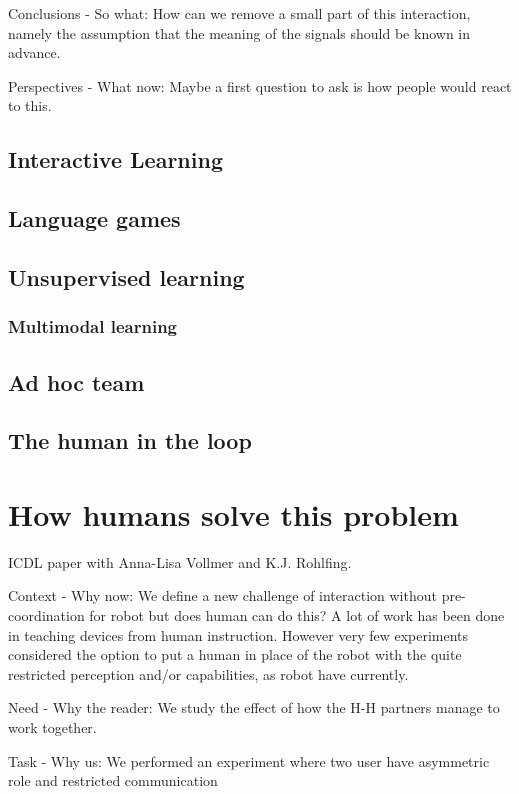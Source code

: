 Conclusions - So what: How can we remove a small part of this interaction, namely the assumption that the meaning of the signals should be known in advance.

Perspectives - What now: Maybe a first question to ask is how people would react to this.

\section{Interactive Learning}

\section{Language games}

\section{Unsupervised learning}

\subsection{Multimodal learning}

\section{Ad hoc team}

\section{The human in the loop}

\chapter{How humans solve this problem}
\minitoc

ICDL paper with Anna-Lisa Vollmer and K.J. Rohlfing.

Context - Why now: We define a new challenge of interaction without pre-coordination for robot but does human can do this? A lot of work has been done in teaching devices from human instruction. However very few experiments considered the option to put a human in place of the robot with the quite restricted perception and/or capabilities, as robot have currently.

Need - Why the reader: We study the effect of how the H-H partners manage to work together.

Task - Why us: We performed an experiment where two user have asymmetric role and restricted communication

